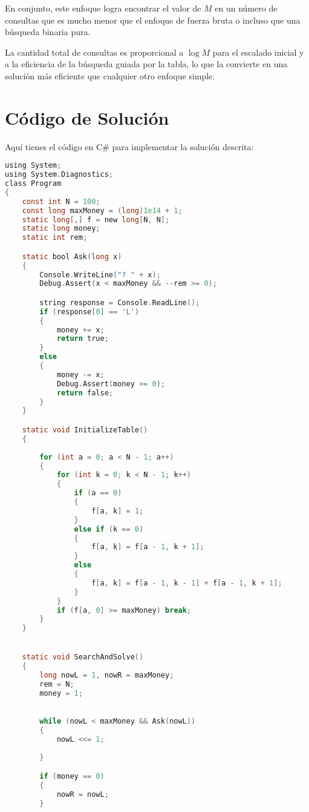 \documentclass{article}
\begin{document}
En conjunto, este enfoque logra encontrar el valor de $M$ en un número de consultas que es mucho menor que el enfoque de fuerza bruta o incluso que una búsqueda binaria pura.

La cantidad total de consultas es proporcional a $\log M$ para el escalado inicial y a la eficiencia de la búsqueda guiada por la tabla, lo que la convierte en una solución más eficiente que cualquier otro enfoque simple.
\section{Código de Solución}

Aquí tienes el código en C\# para implementar la solución descrita:

\begin{lstlisting}[language=C]
using System;
using System.Diagnostics;
class Program
{
    const int N = 100;
    const long maxMoney = (long)1e14 + 1;
    static long[,] f = new long[N, N];
    static long money;
    static int rem;

    static bool Ask(long x)
    {
        Console.WriteLine("? " + x);
        Debug.Assert(x < maxMoney && --rem >= 0);

        string response = Console.ReadLine();
        if (response[0] == 'L')
        {
            money += x;
            return true;
        }
        else
        {
            money -= x;
            Debug.Assert(money >= 0);
            return false;
        }
    }

    static void InitializeTable()
    {
        
        for (int a = 0; a < N - 1; a++)
        {
            for (int k = 0; k < N - 1; k++)
            {
                if (a == 0)
                {
                    f[a, k] = 1;
                }
                else if (k == 0)
                {
                    f[a, k] = f[a - 1, k + 1];
                }
                else
                {
                    f[a, k] = f[a - 1, k - 1] + f[a - 1, k + 1];
                }
            }
            if (f[a, 0] >= maxMoney) break;
        }
    }


    static void SearchAndSolve()
    {
        long nowL = 1, nowR = maxMoney;
        rem = N;
        money = 1;

        
        while (nowL < maxMoney && Ask(nowL))
        {
            nowL <<= 1; 
            
        }

        if (money == 0)
        {
            nowR = nowL;
        }


\end{lstlisting}
\end{document}
